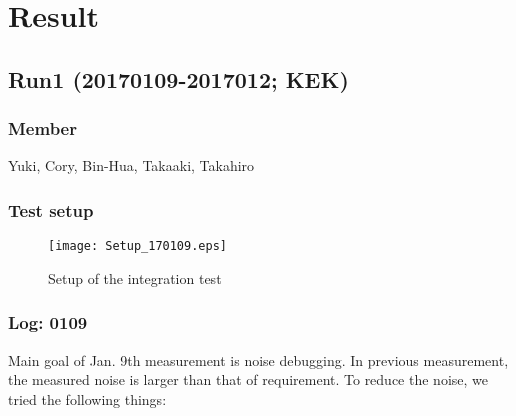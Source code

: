 
\chapter{Result} %

\label{Chapter2} %


\section{Run1 (20170109-2017012; KEK)}
\subsection{Member}
Yuki, Cory, Bin-Hua, Takaaki, Takahiro
\subsection{Test setup}
\begin{figure}
	\begin{center}
                 \texttt{[image: Setup\_170109.eps]}
                 \caption{Setup of the integration test} 
                 \label{fig:Setup} 
	\end{center}
\end{figure}
\pagebreak
\subsection{Log: 01\/09}
Main goal of Jan. 9th measurement is noise debugging.
In previous measurement, the measured noise is larger than that of requirement.
To reduce the noise, we tried the following things:
